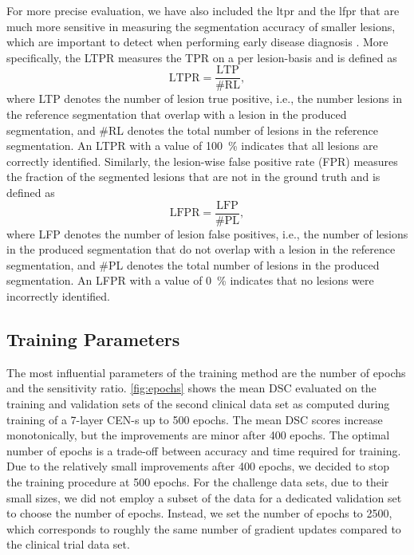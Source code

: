 For more precise evaluation, we have also included the \gls{ltpr} and the
\gls{lfpr} that are much more sensitive in measuring the segmentation accuracy
of smaller lesions, which are important to detect when performing early disease
diagnosis \citep{garcia2013}. More specifically, the LTPR measures the TPR
on a per lesion-basis and is defined as
\begin{equation}
\text{LTPR} = \frac{\text{LTP}}{\text{\#RL}},
\end{equation}
where LTP denotes the number of lesion true positive, i.e., the number
lesions in the reference segmentation that overlap with a lesion in the produced
segmentation, and \#RL denotes the total number of lesions in the reference
segmentation. An LTPR with a value of \SI{100}{\percent} indicates that all
lesions are correctly identified. Similarly, the lesion-wise false positive rate
(FPR) measures the fraction of the segmented lesions that are not in the ground
truth and is defined as
\begin{equation}
\text{LFPR} = \frac{\text{LFP}}{\text{\#PL}},
\end{equation}
where LFP denotes the number of lesion false positives, i.e., the number of
lesions in the produced segmentation that do not overlap with a lesion in the
reference segmentation, and \#PL denotes the total number of lesions in the
produced segmentation. An LFPR with a value of \SI{0}{\percent} indicates that
no lesions were incorrectly identified.

\subsection[Training parameters]{Training Parameters}
\label{sec:trainparams}

The most influential parameters of the training method are the number of epochs
and the sensitivity ratio. \ref{fig:epochs} shows the mean DSC evaluated on
the training and validation sets of the second clinical data set as computed
during training of a \mbox{7-layer} CEN-s up to 500 epochs.
The mean DSC scores increase monotonically, but the improvements are minor after
400 epochs. The optimal number of epochs is a trade-off between accuracy and
time required for training. Due to the relatively small improvements after 400
epochs, we decided to stop the training procedure at 500 epochs. For the
challenge data sets, due to their small sizes, we did not employ a subset of the
data for a dedicated validation set to choose the number of epochs. Instead, we
set the number of epochs to 2500, which corresponds to roughly the same number
of gradient updates compared to the clinical trial data set.

